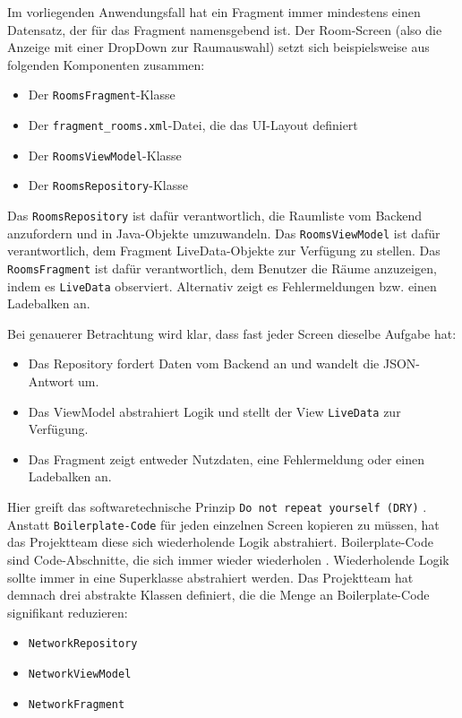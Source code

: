 Im vorliegenden Anwendungsfall hat ein Fragment immer mindestens einen
Datensatz, der für das Fragment namensgebend ist. Der Room-Screen (also
die Anzeige mit einer DropDown zur Raumauswahl) setzt sich
beispielsweise aus folgenden Komponenten zusammen:

\begin{itemize}
\tightlist
\item
  Der \texttt{RoomsFragment}-Klasse
\item
  Der \texttt{fragment\_rooms.xml}-Datei, die das UI-Layout definiert
\item
  Der \texttt{RoomsViewModel}-Klasse
\item
  Der \texttt{RoomsRepository}-Klasse
\end{itemize}

Das \texttt{RoomsRepository} ist dafür verantwortlich, die Raumliste vom
Backend anzufordern und in Java-Objekte umzuwandeln. Das
\texttt{RoomsViewModel} ist dafür verantwortlich, dem Fragment
LiveData-Objekte zur Verfügung zu stellen. Das \texttt{RoomsFragment}
ist dafür verantwortlich, dem Benutzer die Räume anzuzeigen, indem es
\texttt{LiveData} observiert. Alternativ zeigt es Fehlermeldungen bzw.
einen Ladebalken an.

Bei genauerer Betrachtung wird klar, dass fast jeder Screen dieselbe
Aufgabe hat:

\begin{itemize}
\tightlist
\item
  Das Repository fordert Daten vom Backend an und wandelt die
  JSON-Antwort um.
\item
  Das ViewModel abstrahiert Logik und stellt der View \texttt{LiveData}
  zur Verfügung.
\item
  Das Fragment zeigt entweder Nutzdaten, eine Fehlermeldung oder einen
  Ladebalken an.
\end{itemize}

Hier greift das softwaretechnische Prinzip
\texttt{Do\ not\ repeat\ yourself\ (DRY)} \cite{dry}. Anstatt
\texttt{Boilerplate-Code} für jeden einzelnen Screen kopieren zu müssen,
hat das Projektteam diese sich wiederholende Logik abstrahiert.
Boilerplate-Code sind Code-Abschnitte, die sich immer wieder wiederholen
\cite{boiler}. Wiederholende Logik sollte immer in eine Superklasse
abstrahiert werden. Das Projektteam hat demnach drei abstrakte Klassen
definiert, die die Menge an Boilerplate-Code signifikant reduzieren:

\begin{itemize}
\tightlist
\item
  \texttt{NetworkRepository}
\item
  \texttt{NetworkViewModel}
\item
  \texttt{NetworkFragment}
\end{itemize}

